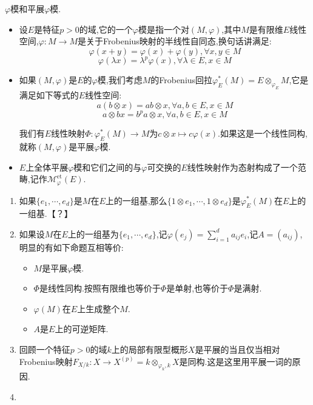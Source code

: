 $\varphi$模和平展$\varphi$模.
\begin{itemize}
	\item 设$E$是特征$p>0$的域,它的一个$\varphi$模是指一个对$(M,\varphi)$,其中$M$是有限维$E$线性空间,$\varphi:M\to M$是关于Frobenius映射的半线性自同态,换句话讲满足:
	$$\varphi(x+y)=\varphi(x)+\varphi(y),\forall x,y\in M$$
	$$\varphi(\lambda x)=\lambda^p\varphi(x),\forall\lambda\in E,x\in M$$
	\item 如果$(M,\varphi)$是$E$的$\varphi$模,我们考虑$M$的Frobenius回拉$\varphi_E^*(M)=E\otimes_{\varphi_E}M$,它是满足如下等式的$E$线性空间:
	$$a(b\otimes x)=ab\otimes x,\forall a,b\in E,x\in M$$
	$$a\otimes bx=b^pa\otimes x,\forall a,b\in E,x\in M$$
	
	我们有$E$线性映射$\Phi:\varphi_E^*(M)\to M$为$c\otimes x\mapsto c\varphi(x)$.如果这是一个线性同构,就称$(M,\varphi)$是平展$\varphi$模.
	\item $E$上全体平展$\varphi$模和它们之间的与$\varphi$可交换的$E$线性映射作为态射构成了一个范畴,记作$\mathscr{M}_{\varphi}^{\mathrm{et}}(E)$.
\end{itemize}
\begin{enumerate}
	\item 如果$\{e_1,\cdots,e_d\}$是$M$在$E$上的一组基,那么$\{1\otimes e_1,\cdots,1\otimes e_d\}$是$\varphi_E^*(M)$在$E$上的一组基.【？】
	\item 如果设$M$在$E$上的一组基为$\{e_1,\cdots,e_d\}$,记$\varphi(e_j)=\sum_{i=1}^da_{ij}e_i$,记$A=(a_{ij})$,明显的有如下命题互相等价:
	\begin{itemize}
		\item $M$是平展$\varphi$模.
		\item $\Phi$是线性同构.按照有限维也等价于$\Phi$是单射,也等价于$\Phi$是满射.
		\item $\varphi(M)$在$E$上生成整个$M$.
		\item $A$是$E$上的可逆矩阵.
	\end{itemize}
	\item 回顾一个特征$p>0$的域$k$上的局部有限型概形$X$是平展的当且仅当相对Frobenius映射$F_{X/k}:X\to X^{(p)}=k\otimes_{\varphi_k,k}X$是同构.这是这里用平展一词的原因.
	\item 
\end{enumerate}















